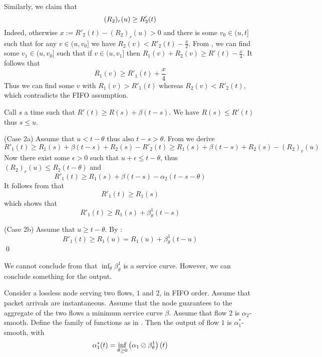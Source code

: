 Similarly, we claim that
\begin{equation}\mylabel{eq-fifosc3}
  (R_2)_r(u) \geq R'_2(t)
\end{equation}
Indeed, otherwise $x:=R'_2(t)- (R_2)_r(u) >0$ and there is some
$v_0 \in (u,t]$ such that for any $v \in (u, v_0]$ we have $R_2(v)
< R'_2(t) - \frac{x}{2}$. From , we can find some
$v_1 \in (u, v_0]$ such that if $v \in (u, v_1]$ then $R_1(v) +
R_2(v) \geq R'(t) - \frac{x}{4}$. It follows that
$$
R_1(v) \geq R'_1(t) + \frac{x}{4}
$$Thus we can find some $v$ with $R_1(v) > R'_1(t)$ whereas $R_2(v)
<R'_2(t)$, which contradicts the FIFO assumption.

Call $s$ a time such that $R'(t) \geq R(s) + \beta(t-s) $. We have
$R(s) \leq R'(t)$ thus $s\leq u$.

(Case 2a) Assume that $u< t-\theta$ thus also $t -s > \theta$.
From  we derive
$$
R'_1(t) \geq R_1(s) + \beta(t-s) + R_2(s) -R'_2(t) \geq R_1(s) +
\beta(t-s) + R_2(s) -(R_2)_r(u)
$$
Now there exist some $\epsilon >0$ such that $u+\epsilon \leq
t-\theta$, thus $(R_2)_r(u) \leq R_2(t-\theta)$ and
$$
R'_1(t) \geq R_1(s) + \beta(t-s) -\alpha_2(t-s -\theta)
$$
It follows from  that
$$
  R'_1(t) \geq R_1(s)
$$
which shows that
$$ R'_1(t) \geq R_1(s) + \beta^1_{\theta}(t-s)
  $$

 (Case 2b)  Assume that $u \geq t-\theta$. By
:
$$
R'_1(t) \geq R_1(u) = R_1(u) + \beta^1_{\theta}(t-u)
$$
 \qed

 We cannot conclude from
 that $\inf_{\theta} \beta^1_{\theta}$ is a
service curve. However, we can conclude something for the output.

\begin{proposition}
Consider a lossless node serving two flows, $1$ and $2$, in FIFO
order. Assume that packet arrivals are instantaneous. Assume that
the node guarantees to the aggregate of the two flows a minimum
service curve $\beta$.
Assume that flow $2$ is $\alpha_2$-smooth. Define the family of
functions as in . Then the output of flow $1$
is $\alpha_1^*$-smooth, with
$$\alpha_1^* (t) = \inf_{\theta \geq 0 }\left(
 \alpha_1 \oslash \beta^1_{\theta}
 \right)(t)
$$
\end{proposition}

